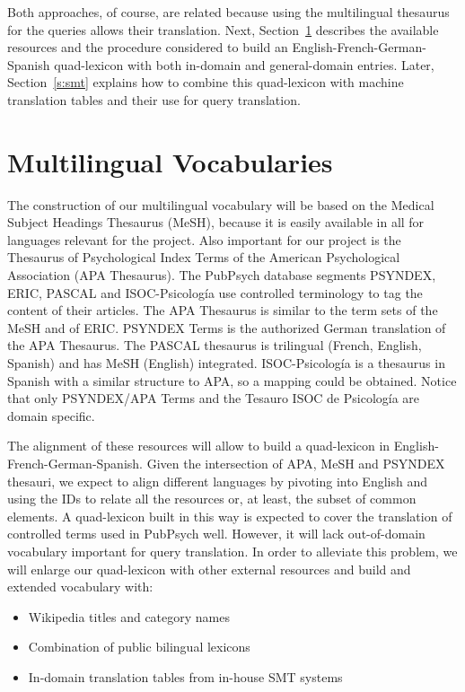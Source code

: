 \documentclass[a4paper,11pt]{article}
\begin{document}
Both approaches, of course, are related because using the multilingual thesaurus for the queries allows their translation.
Next, Section~\ref{s:vocab} describes the available resources and the procedure considered to build an English-French-German-Spanish quad-lexicon with both in-domain and general-domain entries. Later, Section~\ref{s:smt} explains how to combine this quad-lexicon with machine translation tables and their use for query translation.


\section{Multilingual Vocabularies}
\label{s:vocab}

The construction of our multilingual vocabulary will be based on the Medical Subject Headings Thesaurus (MeSH), because it is easily available in all for languages relevant for the project. Also important for our project is the Thesaurus of Psychological Index Terms of the American Psychological Association (APA Thesaurus). The PubPsych database segments PSYNDEX, ERIC, PASCAL and ISOC-Psicolog\'ia use controlled terminology to tag the content of their articles. The APA Thesaurus is similar to the term sets of the MeSH and of ERIC. PSYNDEX Terms is the authorized German translation of the APA Thesaurus. The PASCAL thesaurus is trilingual (French, English, Spanish) and has MeSH (English) integrated. ISOC-Psicolog\'ia is a thesaurus in Spanish with a similar structure to APA, so a mapping could be obtained. Notice that only PSYNDEX/APA Terms and the Tesauro ISOC de Psicolog\'ia are domain specific.

The alignment of these resources will allow to build a quad-lexicon in English-French-German-Spanish. Given the intersection of APA, MeSH and PSYNDEX thesauri, we expect to align different languages by pivoting into English and using the IDs to relate all the resources or, at least, the subset of common elements. A quad-lexicon built in this way is expected to cover the translation of controlled terms used in PubPsych well. However, it will lack out-of-domain vocabulary important for query translation. In order to alleviate this problem, we will enlarge our quad-lexicon with other external resources and build and extended vocabulary with:

\begin{itemize}
 \item Wikipedia titles and category names
 \item Combination of public bilingual lexicons
 \item In-domain translation tables from in-house SMT systems 
\end{itemize}
\end{document}
